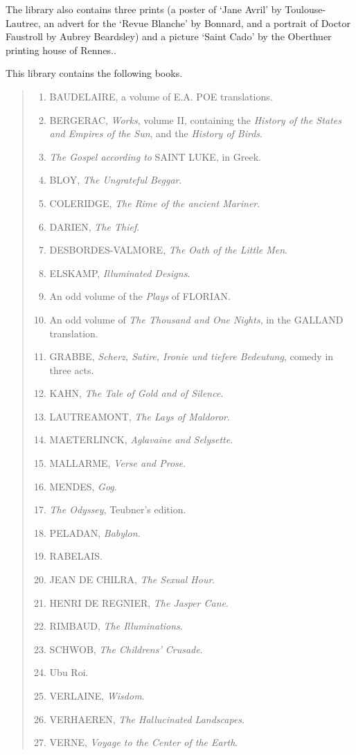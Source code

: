 The library also contains three prints (a poster of `Jane Avril' by Toulouse-Lautrec, an advert for the `Revue Blanche' by Bonnard, and a portrait of Doctor Faustroll by Aubrey Beardsley) and a picture `Saint Cado' by the Oberthuer printing house of Rennes.\autocite[p.12]{Jarry1996}.

This library contains the following books.

\begin{quotation}
  \begin{enumerate}
    \item BAUDELAIRE, a volume of E.A. POE translations.
    \item BERGERAC, \emph{Works}, volume II, containing the \emph{History of the States and Empires of the Sun}, and the \emph{History of Birds}.
    \item \emph{The Gospel according to} SAINT LUKE, in Greek.
    \item BLOY, \emph{The Ungrateful Beggar}.
    \item COLERIDGE, \emph{The Rime of the ancient Mariner}.
    \item DARIEN, \emph{The Thief}.
    \item DESBORDES-VALMORE, \emph{The Oath of the Little Men}.
    \item ELSKAMP, \emph{Illuminated Designs}.
    \item An odd volume of the \emph{Plays} of FLORIAN\@.
    \item An odd volume of \emph{The Thousand and One Nights}, in the GALLAND translation.
    \item GRABBE, \emph{Scherz, Satire, Ironie und tiefere Bedeutung}, comedy in three acts.
    \item KAHN, \emph{The Tale of Gold and of Silence}.
    \item LAUTREAMONT, \emph{The Lays of Maldoror}.
    \item MAETERLINCK, \emph{Aglavaine and Selysette}.
    \item MALLARME, \emph{Verse and Prose}.
    \item MENDES, \emph{Gog}.
    \item \emph{The Odyssey}, Teubner's edition.
    \item PELADAN, \emph{Babylon}.
    \item RABELAIS\@.
    \item JEAN DE CHILRA, \emph{The Sexual Hour}.
    \item HENRI DE REGNIER, \emph{The Jasper Cane}.
    \item RIMBAUD, \emph{The Illuminations}.
    \item SCHWOB, \emph{The Childrens' Crusade}.
    \item Ubu Roi.
    \item VERLAINE, \emph{Wisdom}.
    \item VERHAEREN, \emph{The Hallucinated Landscapes}.
    \item VERNE, \emph{Voyage to the Center of the Earth}.
  \end{enumerate}
\end{quotation}


